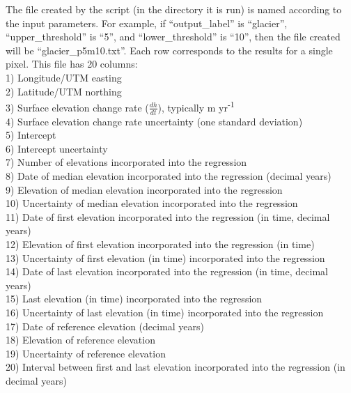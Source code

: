 \documentclass[12pt]{article}
\begin{document}
\noindent The file created by the script (in the directory it is run) is named according to the input parameters.
For example, if ``output\_label'' is ``glacier'', ``upper\_threshold'' is ``5'', and ``lower\_threshold'' is ``10'', then the file created will be ``glacier\_p5m10.txt''.
Each row corresponds to the results for a single pixel.
This file has 20 columns: \\
1) Longitude/UTM easting \\
2) Latitude/UTM northing \\
3) Surface elevation change rate ($\frac{dh}{dt}$), typically m yr\textsuperscript{-1} \\
4) Surface elevation change rate uncertainty (one standard deviation) \\
5) Intercept \\
6) Intercept uncertainty \\
7) Number of elevations incorporated into the regression \\
8) Date of median elevation incorporated into the regression (decimal years) \\
9) Elevation of median elevation incorporated into the regression \\
10) Uncertainty of median elevation incorporated into the regression \\
11) Date of first elevation incorporated into the regression (in time, decimal years) \\
12) Elevation of first elevation incorporated into the regression (in time) \\
13) Uncertainty of first elevation (in time) incorporated into the regression \\
14) Date of last elevation incorporated into the regression (in time, decimal years) \\
15) Last elevation (in time) incorporated into the regression \\
16) Uncertainty of last elevation (in time) incorporated into the regression \\
17) Date of reference elevation (decimal years) \\
18) Elevation of reference elevation \\
19) Uncertainty of reference elevation \\
20) Interval between first and last elevation incorporated into the regression (in decimal years) \\
\end{document}
